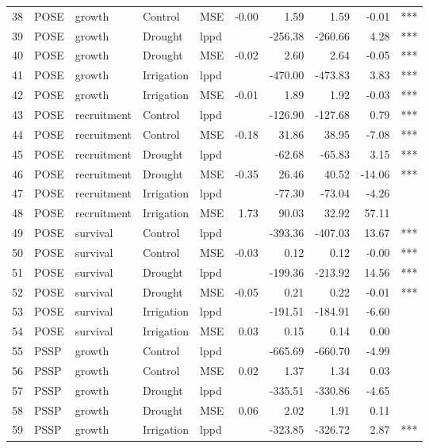 \begin{longtable}{rllllrrrrl}
  38 & POSE & growth & Control & MSE & -0.00 & 1.59 & 1.59 & -0.01 & *** \\ 
  39 & POSE & growth & Drought & lppd &  & -256.38 & -260.66 & 4.28 & *** \\ 
  40 & POSE & growth & Drought & MSE & -0.02 & 2.60 & 2.64 & -0.05 & *** \\ 
  41 & POSE & growth & Irrigation & lppd &  & -470.00 & -473.83 & 3.83 & *** \\ 
  42 & POSE & growth & Irrigation & MSE & -0.01 & 1.89 & 1.92 & -0.03 & *** \\ 
  43 & POSE & recruitment & Control & lppd &  & -126.90 & -127.68 & 0.79 & *** \\ 
  44 & POSE & recruitment & Control & MSE & -0.18 & 31.86 & 38.95 & -7.08 & *** \\ 
  45 & POSE & recruitment & Drought & lppd &  & -62.68 & -65.83 & 3.15 & *** \\ 
  46 & POSE & recruitment & Drought & MSE & -0.35 & 26.46 & 40.52 & -14.06 & *** \\ 
  47 & POSE & recruitment & Irrigation & lppd &  & -77.30 & -73.04 & -4.26 &  \\ 
  48 & POSE & recruitment & Irrigation & MSE & 1.73 & 90.03 & 32.92 & 57.11 &  \\ 
  49 & POSE & survival & Control & lppd &  & -393.36 & -407.03 & 13.67 & *** \\ 
  50 & POSE & survival & Control & MSE & -0.03 & 0.12 & 0.12 & -0.00 & *** \\ 
  51 & POSE & survival & Drought & lppd &  & -199.36 & -213.92 & 14.56 & *** \\ 
  52 & POSE & survival & Drought & MSE & -0.05 & 0.21 & 0.22 & -0.01 & *** \\ 
  53 & POSE & survival & Irrigation & lppd &  & -191.51 & -184.91 & -6.60 &  \\ 
  54 & POSE & survival & Irrigation & MSE & 0.03 & 0.15 & 0.14 & 0.00 &  \\ 
  55 & PSSP & growth & Control & lppd &  & -665.69 & -660.70 & -4.99 &  \\ 
  56 & PSSP & growth & Control & MSE & 0.02 & 1.37 & 1.34 & 0.03 &  \\ 
  57 & PSSP & growth & Drought & lppd &  & -335.51 & -330.86 & -4.65 &  \\ 
  58 & PSSP & growth & Drought & MSE & 0.06 & 2.02 & 1.91 & 0.11 &  \\ 
  59 & PSSP & growth & Irrigation & lppd &  & -323.85 & -326.72 & 2.87 & *** \\ 

\end{longtable}
